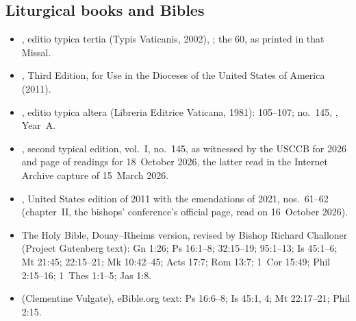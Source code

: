 {\scriptsize
\subsection*{Liturgical books and Bibles}
\begin{itemize}\setlength{\itemsep}{0.15em}\setlength{\parskip}{0pt}
\item {}, editio typica tertia (Typis Vaticanis, 2002), ; the  60, as printed in that Missal.
\item {}, Third Edition, for Use in the Dioceses of the United States of America (2011).
\item {}, editio typica altera (Libreria Editrice Vaticana, 1981):  105--107; no.~145, , Year~A.
\item {}, second typical edition, vol.~I, no.~145, as witnessed by the USCCB  for 2026 and page of readings for 18~October 2026, the latter read in the Internet Archive capture of 15~March 2026.
\item {}, United States edition of 2011 with the emendations of 2021, nos.~61--62 (chapter~II, the bishops' conference's official page, read on 16~October 2026).
\item The Holy Bible, Douay--Rheims version, revised by Bishop Richard Challoner (Project Gutenberg text): Gn 1:26; Ps 16:1--8; 32:15--19; 95:1--13; Is 45:1--6; Mt 21:45; 22:15--21; Mk 10:42--45; Acts 17:7; Rom 13:7; 1~Cor 15:49; Phil 2:15--16; 1~Thes 1:1--5; Jas 1:8.
\item {} (Clementine Vulgate), eBible.org text: Ps 16:6--8; Is 45:1, 4; Mt 22:17--21; Phil 2:15.
\end{itemize}

}
